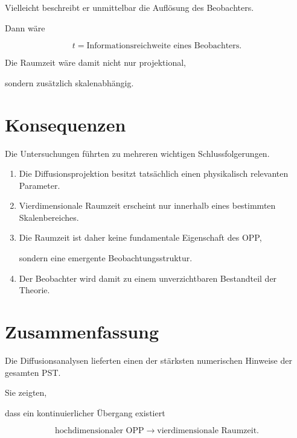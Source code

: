 Vielleicht beschreibt er unmittelbar die Auflösung des Beobachters.

Dann wäre

\[
\boxed{
t
=
\text{Informationsreichweite eines Beobachters}.
}
\]

Die Raumzeit wäre damit nicht nur projektional,

sondern zusätzlich skalenabhängig.


\section*{Konsequenzen}

Die Untersuchungen führten zu mehreren wichtigen Schlussfolgerungen.

\begin{enumerate}

\item

Die Diffusionsprojektion besitzt tatsächlich einen physikalisch relevanten Parameter.

\item

Vierdimensionale Raumzeit erscheint nur innerhalb eines bestimmten Skalenbereiches.

\item

Die Raumzeit ist daher keine fundamentale Eigenschaft des OPP,

sondern eine emergente Beobachtungsstruktur.

\item

Der Beobachter wird damit zu einem unverzichtbaren Bestandteil der Theorie.

\end{enumerate}


\section*{Zusammenfassung}

Die Diffusionsanalysen lieferten einen der stärksten numerischen Hinweise der gesamten PST.

Sie zeigten,

dass ein kontinuierlicher Übergang existiert

\[
\boxed{
\text{hochdimensionaler OPP}
\longrightarrow
\text{vierdimensionale Raumzeit}.
}
\]

